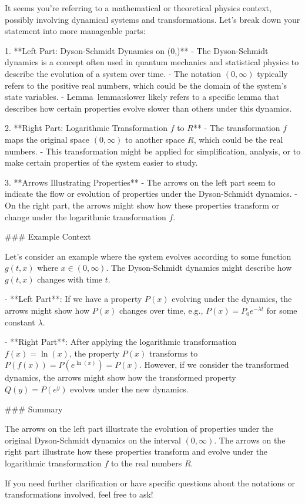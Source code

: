 It seems you're referring to a mathematical or theoretical physics context, possibly involving dynamical systems and transformations. Let's break down your statement into more manageable parts:

1. **Left Part: Dyson-Schmidt Dynamics on (0,)**
   - The Dyson-Schmidt dynamics is a concept often used in quantum mechanics and statistical physics to describe the evolution of a system over time.
   - The notation \((0,\infty)\) typically refers to the positive real numbers, which could be the domain of the system's state variables.
   - Lemma~lemma:slower likely refers to a specific lemma that describes how certain properties evolve slower than others under this dynamics.

2. **Right Part: Logarithmic Transformation \(f\) to \(R\)**
   - The transformation \(f\) maps the original space \((0,\infty)\) to another space \(R\), which could be the real numbers.
   - This transformation might be applied for simplification, analysis, or to make certain properties of the system easier to study.

3. **Arrows Illustrating Properties**
   - The arrows on the left part seem to indicate the flow or evolution of properties under the Dyson-Schmidt dynamics.
   - On the right part, the arrows might show how these properties transform or change under the logarithmic transformation \(f\).

### Example Context

Let's consider an example where the system evolves according to some function \(g(t, x)\) where \(x \in (0,\infty)\). The Dyson-Schmidt dynamics might describe how \(g(t, x)\) changes with time \(t\).

- **Left Part**: If we have a property \(P(x)\) evolving under the dynamics, the arrows might show how \(P(x)\) changes over time, e.g., \(P(x) = P_0 e^{-\lambda t}\) for some constant \(\lambda\).
  
- **Right Part**: After applying the logarithmic transformation \(f(x) = \ln(x)\), the property \(P(x)\) transforms to \(P(f(x)) = P(e^{\ln(x)}) = P(x)\). However, if we consider the transformed dynamics, the arrows might show how the transformed property \(Q(y) = P(e^y)\) evolves under the new dynamics.

### Summary

The arrows on the left part illustrate the evolution of properties under the original Dyson-Schmidt dynamics on the interval \((0,\infty)\). The arrows on the right part illustrate how these properties transform and evolve under the logarithmic transformation \(f\) to the real numbers \(R\).

If you need further clarification or have specific questions about the notations or transformations involved, feel free to ask!